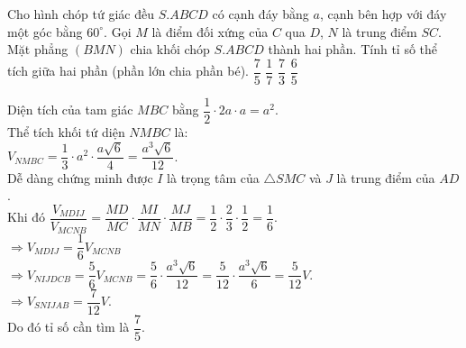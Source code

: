 \begin{ex}%
Cho hình chóp tứ giác đều $S.ABCD$ có cạnh đáy bằng $a$, cạnh bên hợp với đáy một góc bằng $60^\circ$. Gọi $M$ là điểm đối xứng của $C$ qua $D$, $N$ là trung điểm $SC$. Mặt phẳng $(BMN)$ chia khối chóp $S.ABCD$ thành hai phần. Tính tỉ số thể tích giữa hai phần (phần lớn chia phần bé).
 \choice
  {\True $\dfrac{7}{5}$}
  {$\dfrac{1}{7}$}
  {$\dfrac{7}{3}$}
  {$\dfrac{6}{5}$}
 \loigiai
  {
  {
  }
  
  Diện tích của tam giác $MBC$ bằng $\dfrac{1}{2}\cdot 2a \cdot a = a^2$.\\
   Thể tích khối tứ diện $NMBC$ là:\\
   $V_{NMBC}=\dfrac{1}{3}\cdot a^2 \cdot \dfrac{a\sqrt{6}}{4}=\dfrac{a^3\sqrt{6}}{12}$.\\
   Dễ dàng chứng minh được $I$ là trọng tâm của $\triangle SMC$ và $J$ là trung điểm của $AD$.\\
   Khi đó $\dfrac{V_{MDIJ}}{V_{MCNB}}=\dfrac{MD}{MC}\cdot\dfrac{MI}{MN}\cdot\dfrac{MJ}{MB}=\dfrac{1}{2}\cdot\dfrac{2}{3}\cdot\dfrac{1}{2}=\dfrac{1}{6}$.\\
   $\Rightarrow V_{MDIJ}=\dfrac{1}{6}V_{MCNB}$\\
   $\Rightarrow V_{NIJDCB}=\dfrac{5}{6}V_{MCNB}=\dfrac{5}{6}\cdot\dfrac{a^3\sqrt{6}}{12}=\dfrac{5}{12}\cdot\dfrac{a^3\sqrt{6}}{6}=\dfrac{5}{12}V$.\\
   $\Rightarrow V_{SNIJAB}=\dfrac{7}{12}V$.\\
   Do đó tỉ số cần tìm là $\dfrac{7}{5}$.
  }
\end{ex}



